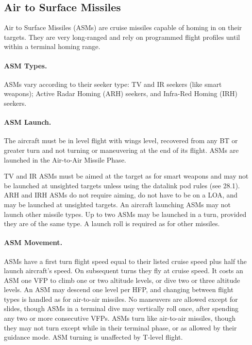 \begin{advancedrules}
    

\section{Air to Surface Missiles}

Air to Surface Missiles (ASMs) are cruise missiles capable of homing in on their targets.  They are very long-ranged and rely on programmed flight profiles until within a terminal homing range.

\paragraph{ASM Types.} ASMs vary according to their seeker type: TV and IR seekers (like smart weapons); Active Radar Homing (ARH) seekers, and Infra-Red Homing (IRH) seekers.

\paragraph{ASM Launch.} The aircraft must be in level flight with wings level, recovered from any BT or greater turn and not turning or maneuvering at the end of its flight.  ASMs are launched in the Air-to-Air Missile Phase.

TV and IR ASMs must be aimed at the target as for smart weapons and may not be launched at unsighted targets unless using the datalink pod rules (see 28.1).  ARH and IRH ASMs do not require aiming, do not have to be on a LOA, and may be launched at unsighted targets.  An aircraft launching ASMs may not launch other missile types.  Up to two ASMs may be launched in a turn, provided they are of the same type.  A launch roll is required as for other missiles.


\paragraph{ASM Movement.} ASMs have a first turn flight speed equal to their listed cruise speed plus half the launch aircraft's speed.  On subsequent turns they fly at cruise speed.  It costs an ASM one VFP to climb one or two altitude levels, or dive two or three altitude levels.   An ASM may descend one level per HFP, and changing between flight types is handled as for air-to-air missiles.  No maneuvers are allowed except for slides, though ASMs in a terminal dive may vertically roll once, after spending any two or more consecutive VFPs.  ASMs turn like air-to-air missiles, though they may not turn except while in their terminal phase, or as allowed by their guidance mode.  ASM turning is unaffected by T-level flight.


\end{advancedrules}
